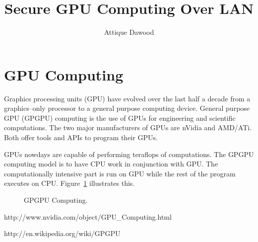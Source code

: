 \documentclass{article}
\begin{document}
\title{Secure GPU Computing Over LAN}
\author{Attique Dawood}
\maketitle

\section{GPU Computing}

Graphics processing units (GPU) have evolved over the last half a decade from a graphics--only processor to a general purpose computing device. General purpose GPU (GPGPU) computing is the use of GPUs for engineering and scientific computations. The two major manufacturers of GPUs are nVidia and AMD/ATi. Both offer tools and APIs to program their GPUs.

GPUs nowdays are capable of performing teraflops of computations. The GPGPU computing model is to have CPU work in conjunction with GPU. The computationally intensive part is run on GPU while the rest of the program executes on CPU. Figure~\ref{nVidiaGPGPUfig} illustrates this.

\begin{figure}[here]
\centering
{}
\caption{GPGPU Computing.}
\label{nVidiaGPGPUfig}
\end{figure}

\begin{thebibliography}{2}

http://www.nvidia.com/object/GPU\_Computing.html

http://en.wikipedia.org/wiki/GPGPU

\end{thebibliography}
\end{document}
